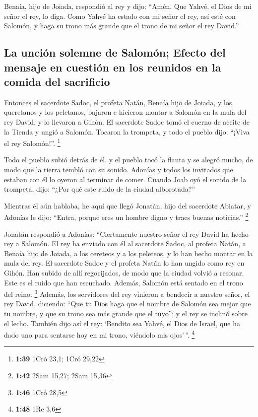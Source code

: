  Benaía, hijo de Joiada, respondió al rey y dijo: ``Amén.
Que Yahvé, el Dios de mi señor el rey, lo diga.  Como
Yahvé ha estado con mi señor el rey, así esté con Salomón, y haga su
trono más grande que el trono de mi señor el rey David.''

\hypertarget{la-unciuxf3n-solemne-de-salomuxf3n-efecto-del-mensaje-en-cuestiuxf3n-en-los-reunidos-en-la-comida-del-sacrificio}{%
\subsection{La unción solemne de Salomón; Efecto del mensaje en cuestión
en los reunidos en la comida del
sacrificio}\label{la-unciuxf3n-solemne-de-salomuxf3n-efecto-del-mensaje-en-cuestiuxf3n-en-los-reunidos-en-la-comida-del-sacrificio}}

 Entonces el sacerdote Sadoc, el profeta Natán, Benaía
hijo de Joiada, y los queretanos y los peletanos, bajaron e hicieron
montar a Salomón en la mula del rey David, y lo llevaron a Gihón.
 El sacerdote Sadoc tomó el cuerno de aceite de la Tienda
y ungió a Salomón. Tocaron la trompeta, y todo el pueblo dijo: ``¡Viva
el rey Salomón!''. \footnote{\textbf{1:39} 1Cró 23,1; 1Cró 29,22}

 Todo el pueblo subió detrás de él, y el pueblo tocó la
flauta y se alegró mucho, de modo que la tierra tembló con su sonido.
 Adonías y todos los invitados que estaban con él lo
oyeron al terminar de comer. Cuando Joab oyó el sonido de la trompeta,
dijo: ``¿Por qué este ruido de la ciudad alborotada?''

 Mientras él aún hablaba, he aquí que llegó Jonatán, hijo
del sacerdote Abiatar, y Adonías le dijo: ``Entra, porque eres un hombre
digno y traes buenas noticias.'' \footnote{\textbf{1:42} 2Sam 15,27;
  2Sam 15,36}

 Jonatán respondió a Adonías: ``Ciertamente nuestro señor
el rey David ha hecho rey a Salomón.  El rey ha enviado
con él al sacerdote Sadoc, al profeta Natán, a Benaía hijo de Joiada, a
los cereteos y a los peleteos, y lo han hecho montar en la mula del rey.
 El sacerdote Sadoc y el profeta Natán lo han ungido como
rey en Gihón. Han subido de allí regocijados, de modo que la ciudad
volvió a resonar. Este es el ruido que han escuchado. 
Además, Salomón está sentado en el trono del reino. \footnote{\textbf{1:46}
  1Cró 28,5}  Además, los servidores del rey vinieron a
bendecir a nuestro señor, el rey David, diciendo: ``Que tu Dios haga que
el nombre de Salomón sea mejor que tu nombre, y que su trono sea más
grande que el tuyo''; y el rey se inclinó sobre el lecho.
 También dijo así el rey: `Bendito sea Yahvé, el Dios de
Israel, que ha dado uno para sentarse hoy en mi trono, viéndolo mis
ojos'\,''. \footnote{\textbf{1:48} 1Re 3,6}

